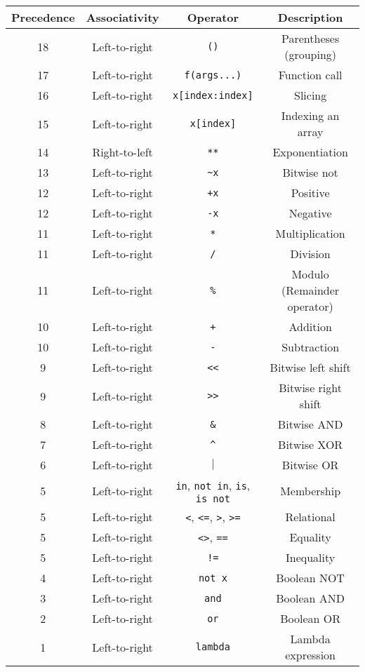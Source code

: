 \documentclass[11pt]{article}
\begin{document}
\begin{center}
\begin{tabular}{c|c|c|c}
\textbf{Precedence} & \textbf{Associativity} & \textbf{Operator} & \textbf{Description}\\
\hline
18 & Left-to-right & \texttt{()} & Parentheses (grouping)\\
17 & Left-to-right & \texttt{f(args...)} & Function call\\
16 & Left-to-right & \texttt{x[index:index]} & Slicing\\
15 & Left-to-right & \texttt{x[index]} & Indexing an array\\
14 & Right-to-left & \texttt{**} & Exponentiation\\
13 & Left-to-right & \texttt{\textasciitilde{}x} & Bitwise not\\
12 & Left-to-right & \texttt{+x} & Positive\\
12 & Left-to-right & \texttt{-x} & Negative\\
11 & Left-to-right & \texttt{*} & Multiplication\\
11 & Left-to-right & \texttt{/} & Division\\
11 & Left-to-right & \texttt{\%} & Modulo (Remainder operator)\\
10 & Left-to-right & \texttt{+} & Addition\\
10 & Left-to-right & \texttt{-} & Subtraction\\
9 & Left-to-right & \texttt{<{}<{}} & Bitwise left shift\\
9 & Left-to-right & \texttt{>{}>{}} & Bitwise right shift\\
8 & Left-to-right & \texttt{\&} & Bitwise AND\\
7 & Left-to-right & \texttt{\textasciicircum{}} & Bitwise XOR\\
6 & Left-to-right & \(\vert{}\) & Bitwise OR\\
5 & Left-to-right & \texttt{in}, \texttt{not in}, \texttt{is}, \texttt{is not} & Membership\\
5 & Left-to-right & \texttt{<}, \texttt{<=}, \texttt{>}, \texttt{>=} & Relational\\
5 & Left-to-right & \texttt{<>}, \texttt{==} & Equality\\
5 & Left-to-right & \texttt{!=} & Inequality\\
4 & Left-to-right & \texttt{not x} & Boolean NOT\\
3 & Left-to-right & \texttt{and} & Boolean AND\\
2 & Left-to-right & \texttt{or} & Boolean OR\\
1 & Left-to-right & \texttt{lambda} & Lambda expression\\
\end{tabular}
\end{center}
\end{document}

